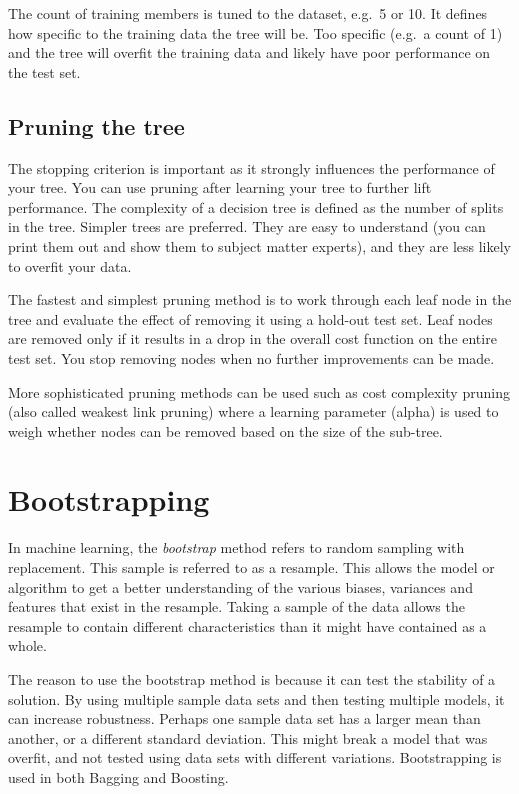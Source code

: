 \documentclass{book}
\begin{document}
The count of training members is tuned to the dataset, e.g.\ 5 or 10. It defines how specific to the training data the tree will be. Too specific (e.g.\ a count of 1) and the tree will overfit the training data and likely have poor performance on the test set.

\subsection{Pruning the tree}
The stopping criterion is important as it strongly influences the performance of your tree. You can use pruning after learning your tree to further lift performance.
The complexity of a decision tree is defined as the number of splits in the tree. Simpler trees are preferred. They are easy to understand (you can print them out and show them to subject matter experts), and they are less likely to overfit your data.

The fastest and simplest pruning method is to work through each leaf node in the tree and evaluate the effect of removing it using a hold-out test set. Leaf nodes are removed only if it results in a drop in the overall cost function on the entire test set. You stop removing nodes when no further improvements can be made.

More sophisticated pruning methods can be used such as cost complexity pruning (also called weakest link pruning) where a learning parameter (alpha) is used to weigh whether nodes can be removed based on the size of the sub-tree.

\section{Bootstrapping}
In machine learning, the \emph{bootstrap} method refers to random sampling with replacement. This sample is referred to as a resample. 
This allows the model or algorithm to get a better understanding of the various biases, variances and features that exist in the resample. Taking a sample of the data allows the resample to contain different characteristics than it might have contained as a whole.

The reason to use the bootstrap method is because it can test the stability of a solution. By using multiple sample data sets and then testing multiple models, it can increase robustness. Perhaps one sample data set has a larger mean than another, or a different standard deviation. This might break a model that was overfit, and not tested using data sets with different variations. Bootstrapping is used in both Bagging and Boosting.
\end{document}
